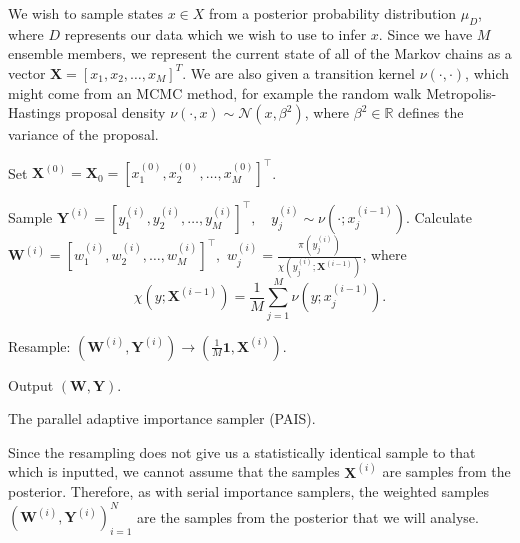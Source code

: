 \documentclass[final]{siamltex}
\newcommand{\X}{{\mathbf X}}
\newcommand{\Y}{{\mathbf Y}}
\newcommand{\W}{{\mathbf W}}
\begin{document}
We wish to sample states $x \in X$ from a posterior
probability distribution $\mu_D$, where $D$ represents our data which
we wish to use to infer $x$. Since we have $M$ ensemble members, we
represent the current state of all of the Markov chains as a vector
$\X = [x_1,x_2,\ldots,x_M]^T$. We are also given a transition kernel
$\nu(\cdot,\cdot)$, which might come from an MCMC method, for example
the random walk Metropolis-Hastings proposal density $\nu(\cdot,x) \sim
\mathcal{N}(x,\beta^2)$, where $\beta^2\in \mathbb{R}$ defines the
variance of the proposal.


\begin{table}[!h]
\centering
\begin{algorithm}[H]
\DontPrintSemicolon
\BlankLine
	Set $\X^{(0)} = \X_0 = [x_1^{(0)},x_2^{(0)},\ldots,x_M^{(0)}]^\top$.\;
	{
		Sample $\Y^{(i)} = [y_1^{(i)},y_2^{(i)},\ldots,y_M^{(i)}]^\top, \quad y_j^{(i)} \sim
\nu(\cdot;x_j^{(i-1)})$.\;
		Calculate $\W^{(i)} = [w_1^{(i)},w_2^{(i)},\ldots,w_M^{(i)}]^\top,$ \quad $w^{(i)}_j =
\frac{\pi(y_j^{(i)})}{\chi(y_j^{(i)};\X^{(i-1)})}$, where
		\[
			\chi(y;\X^{(i-1)}) = \frac{1}{M}\sum_{j=1}^M \nu(y;x_j^{(i-1)}).
		\]

		Resample: $(\W^{(i)},\Y^{(i)}) \rightarrow (\frac{1}{M}\mathbf{1}, \X^{(i)})$.
	}
	Output $(\W, \Y)$.\;
\caption{The parallel adaptive importance sampler (PAIS).\label{alg:PAIS}}
\end{algorithm}
\end{table}

Since the resampling does not give us a statistically identical sample
to that which is inputted, we cannot assume that the samples $\X^{(i)}$
are samples from the posterior. Therefore, as with serial
importance samplers, the weighted samples
$(\W^{(i)},\Y^{(i)})_{i=1}^N$ are the samples from the posterior that
we will analyse.
\end{document}
